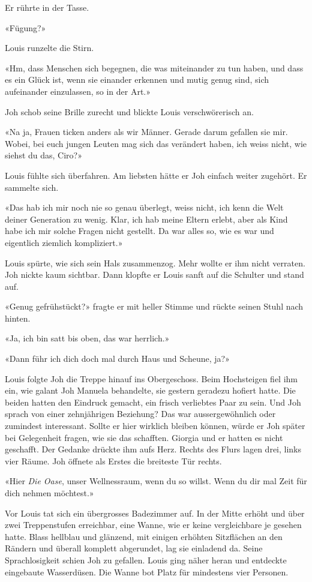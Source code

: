 Er rührte in der Tasse.

«Fügung?»

Louis runzelte die Stirn.

«Hm, dass Menschen sich begegnen, die was miteinander zu tun haben, und
dass es ein Glück ist, wenn sie einander erkennen und mutig genug sind, sich aufeinander einzulassen, 
so in der Art.»

Joh schob seine Brille zurecht und blickte Louis verschwörerisch an.

«Na ja, Frauen ticken anders als wir Männer. Gerade darum gefallen sie
mir. Wobei, bei euch jungen Leuten mag sich das verändert haben, ich
weiss nicht, wie siehst du das, Ciro?»

Louis fühlte sich überfahren. Am liebsten hätte er Joh einfach weiter
zugehört. Er sammelte sich.

«Das hab ich mir noch nie so genau überlegt, weiss nicht, ich kenn die
Welt deiner Generation zu wenig. Klar, ich hab meine Eltern erlebt, aber
als Kind habe ich mir solche Fragen nicht gestellt. Da war alles so, wie
es war und eigentlich ziemlich kompliziert.»

Louis spürte, wie sich sein Hals zusammenzog. Mehr wollte er ihm nicht
verraten. Joh nickte kaum sichtbar. Dann klopfte er Louis sanft auf die
Schulter und stand auf.

«Genug gefrühstückt?» fragte er mit heller Stimme und rückte seinen 
Stuhl nach hinten.

«Ja, ich bin satt bis oben, das war herrlich.»

«Dann führ ich dich doch mal durch Haus und Scheune, ja?»

Louis folgte Joh die Treppe hinauf ins Obergeschoss. Beim Hochsteigen
fiel ihm ein, wie galant Joh Manuela behandelte, sie gestern geradezu
hofiert hatte. Die beiden hatten den Eindruck gemacht, ein frisch
verliebtes Paar zu sein. Und Joh sprach von einer zehnjährigen Beziehung? 
Das war aussergewöhnlich oder zumindest interessant. Sollte
er hier wirklich bleiben können, würde er Joh später bei Gelegenheit
fragen, wie sie das schafften. Giorgia und er hatten es nicht geschafft.
Der Gedanke drückte ihm aufs Herz.
Rechts des Flurs lagen drei, links vier Räume. Joh öffnete als Erstes
die breiteste Tür rechts.

«Hier \emph{Die Oase}, unser Wellnessraum, wenn du so willst. Wenn du
dir mal Zeit für dich nehmen möchtest.»

Vor Louis tat sich ein übergrosses Badezimmer auf. In der Mitte erhöht
und über zwei Treppenstufen erreichbar, eine Wanne, wie er keine
vergleichbare je gesehen hatte. Blass hellblau und glänzend, mit einigen
erhöhten Sitzflächen an den Rändern und überall komplett abgerundet, lag
sie einladend da. Seine Sprachlosigkeit schien Joh zu gefallen. Louis ging näher heran und entdeckte eingebaute Wasserdüsen. Die Wanne bot Platz für mindestens vier Personen.

